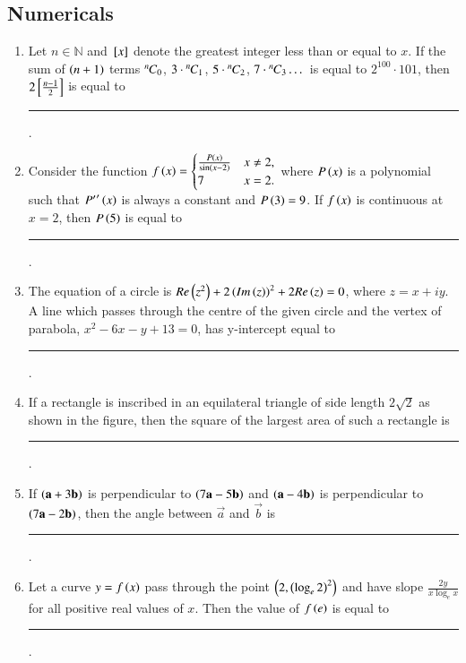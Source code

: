 \documentclass[journal,12pt,onecolumn]{IEEEtran}
\theoremstyle{remark}
\begin{document}
\subsection{Numericals}
\begin{enumerate}

\item Let $n\in \mathbb{N}$ and ${}\left[x\right]$ denote the greatest integer less than or equal to $x$. If the sum of $\left(n+1\right)$ terms ${{}^{n}\mkern-1muC_{0}}$, $3\cdot{{}^{n}\mkern-1muC_{1}}$, $5\cdot{{}^{n}\mkern-1muC_{2}}$, $7\cdot{{}^{n}\mkern-1muC_{3}} \dots$ is equal to $2^{100}\cdot 101$, then $2{}\left[\frac{n-1}{2}\right]$ is equal to \rule{1cm}{0.15mm}.

\hfill{}

\item Consider the function $f\left(x\right) = \begin{cases} \frac{P\left(x\right)}{\sin\left(x-2\right)} & x\neq 2, \\7 & x=2 .\end{cases}$ where $P\left(x\right)$ is a polynomial such that ${P^\prime}^\prime\left(x\right)$ is always a constant and $P\left(3\right)=9$. If $f\left(x\right)$ is continuous at $x=2$, then $P\left(5\right)$ is equal to \rule{1cm}{0.15mm}.

\hfill{}

\item The equation of a circle is $Re\left(z^2\right)+2\left(Im\left(z\right)\right)^2+2Re\left(z\right)=0$, where $z=x+iy$. A line which passes through the centre of the given circle and the vertex of parabola, $x^2-6x-y+13=0$, has y-intercept equal to \rule{1cm}{0.15mm}.

\hfill{}

\item If a rectangle is inscribed in an equilateral triangle of side length $2\sqrt{2}$ as shown in the figure, then the square of the largest area of such a rectangle is \rule{1cm}{0.15mm}.

\hfill{}

\item If $\left(\mathbf{a}+3\mathbf{b}\right)$ is perpendicular to $\left(7\mathbf{a}-5\mathbf{b}\right)$ and $\left(\mathbf{a}-4\mathbf{b}\right)$ is perpendicular to $\left(7\mathbf{a}-2\mathbf{b}\right)$, then the angle between $\vec{a}$ and $\vec{b}$  is \rule{1cm}{0.15mm}.

\hfill{}

\item Let a curve $y=f\left(x\right)$ pass through the point $\left(2,\left(\log_e{2}\right)^2\right)$ and have slope $\frac{2y}{x\log_e{x}}$ for all positive real values of $x$. Then the value of $f\left(e\right)$ is equal to \rule{1cm}{0.15mm}.


\end{enumerate}
\end{document}

